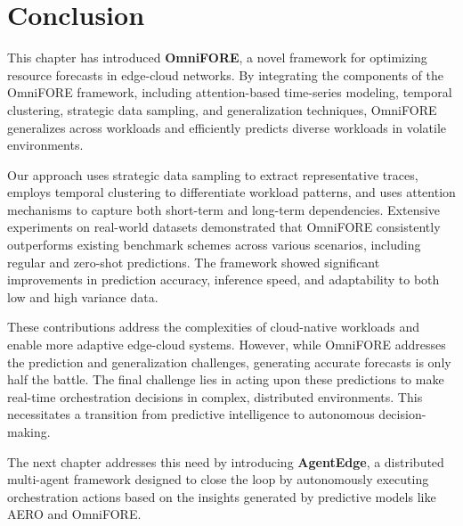 \section{Conclusion}
\label{sec:ch4_conclusion}

This chapter has introduced \textbf{OmniFORE}, a novel framework for optimizing resource forecasts in edge-cloud networks. By integrating the components of the OmniFORE framework, including attention-based time-series modeling, temporal clustering, strategic data sampling, and generalization techniques, OmniFORE generalizes across workloads and efficiently predicts diverse workloads in volatile environments.

Our approach uses strategic data sampling to extract representative traces, employs temporal clustering to differentiate workload patterns, and uses attention mechanisms to capture both short-term and long-term dependencies. Extensive experiments on real-world datasets demonstrated that \ac{OmniFORE} consistently outperforms existing benchmark schemes across various scenarios, including regular and zero-shot predictions. The framework showed significant improvements in prediction accuracy, inference speed, and adaptability to both low and high variance data.

These contributions address the complexities of cloud-native workloads and enable more adaptive edge-cloud systems. However, while \ac{OmniFORE} addresses the prediction and generalization challenges, generating accurate forecasts is only half the battle. The final challenge lies in acting upon these predictions to make real-time orchestration decisions in complex, distributed environments. This necessitates a transition from predictive intelligence to autonomous decision-making.

The next chapter addresses this need by introducing \textbf{AgentEdge}, a distributed multi-agent framework designed to close the loop by autonomously executing orchestration actions based on the insights generated by predictive models like \ac{AERO} and \ac{OmniFORE}.
